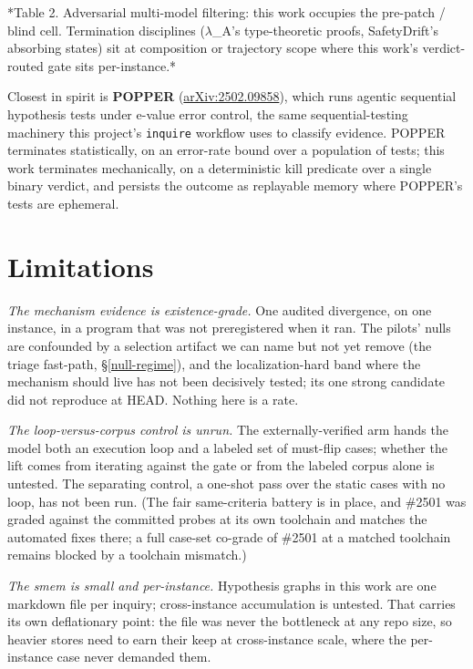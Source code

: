 \documentclass[
  10pt,
]{article}
\begin{document}
*Table 2. Adversarial multi-model filtering: this work occupies the
pre-patch / blind cell. Termination disciplines (\(\lambda\)\_A's
type-theoretic proofs, SafetyDrift's absorbing states) sit at
composition or trajectory scope where this work's verdict-routed gate
sits per-instance.*

Closest in spirit is \textbf{POPPER}
(\href{https://arxiv.org/abs/2502.09858}{arXiv:2502.09858}), which runs
agentic sequential hypothesis tests under e-value error control, the
same sequential-testing machinery this project's \texttt{inquire}
workflow uses to classify evidence. POPPER terminates statistically, on
an error-rate bound over a population of tests; this work terminates
mechanically, on a deterministic kill predicate over a single binary
verdict, and persists the outcome as replayable memory where POPPER's
tests are ephemeral.

\section{Limitations}\label{limitations}

\emph{The mechanism evidence is existence-grade.} One audited
divergence, on one instance, in a program that was not preregistered
when it ran. The pilots' nulls are confounded by a selection artifact we
can name but not yet remove (the triage fast-path, \S\ref{null-regime}),
and the localization-hard band where the mechanism should live has not
been decisively tested; its one strong candidate did not reproduce at
HEAD. Nothing here is a rate.

\emph{The loop-versus-corpus control is unrun.} The externally-verified
arm hands the model both an execution loop and a labeled set of
must-flip cases; whether the lift comes from iterating against the gate
or from the labeled corpus alone is untested. The separating control, a
one-shot pass over the static cases with no loop, has not been run. (The
fair same-criteria battery is in place, and \#2501 was graded against
the committed probes at its own toolchain and matches the automated
fixes there; a full case-set co-grade of \#2501 at a matched toolchain
remains blocked by a toolchain mismatch.)

\emph{The smem is small and per-instance.} Hypothesis graphs in this
work are one markdown file per inquiry; cross-instance accumulation is
untested. That carries its own deflationary point: the file was never
the bottleneck at any repo size, so heavier stores need to earn their
keep at cross-instance scale, where the per-instance case never demanded
them.
\end{document}
